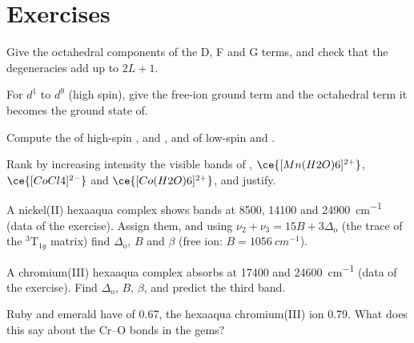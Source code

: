\section{Exercises}

\begin{exercise}[$\star$]\label{exo:b3:complex-spectra-magnetism:1}
Give the octahedral components of the D, F and G terms, and check that the
degeneracies add up to $2L + 1$.
\end{exercise}

\begin{exercise}[$\star$]\label{exo:b3:complex-spectra-magnetism:2}
For $d^1$ to $d^9$ (high spin), give the free-ion ground term and the octahedral term it
becomes the ground state of.
\end{exercise}

\begin{exercise}[$\star$]\label{exo:b3:complex-spectra-magnetism:3}
Compute the  of high-spin ,  and , and of low-spin
 and .
\end{exercise}

\begin{exercise}[$\star$]\label{exo:b3:complex-spectra-magnetism:4}
Rank by increasing intensity the visible bands of , $\ce{[Mn(H2O)6]^{2+}}$, $\ce{[CoCl4]^{2-}}$ and
$\ce{[Co(H2O)6]^{2+}}$, and justify.
\end{exercise}

\begin{exercise}[$\star\star$]\label{exo:b3:complex-spectra-magnetism:5}
A nickel(II) hexaaqua complex shows bands at 8500, 14100 and \qty{24900}{cm^{-1}} (data of
the exercise). Assign them, and using $\nu_2 + \nu_3 = 15B + 3\Delta_{\mathrm o}$ (the trace of the $^3$T$_{1g}$
matrix) find $\Delta_{\mathrm o}$, $B$ and $\beta$ (free ion: $B = \qty{1056}{cm^{-1}}$).
\end{exercise}

\begin{exercise}[$\star\star$]\label{exo:b3:complex-spectra-magnetism:6}
A chromium(III) hexaaqua complex absorbs at 17400 and \qty{24600}{cm^{-1}} (data of the
exercise). Find $\Delta_{\mathrm o}$, $B$, $\beta$, and predict the third band.
\end{exercise}

\begin{exercise}[$\star\star$]\label{exo:b3:complex-spectra-magnetism:7}
Ruby and emerald have  of 0.67, the hexaaqua chromium(III)
ion 0.79. What does this say about the Cr--O bonds in the gems?
\end{exercise}

